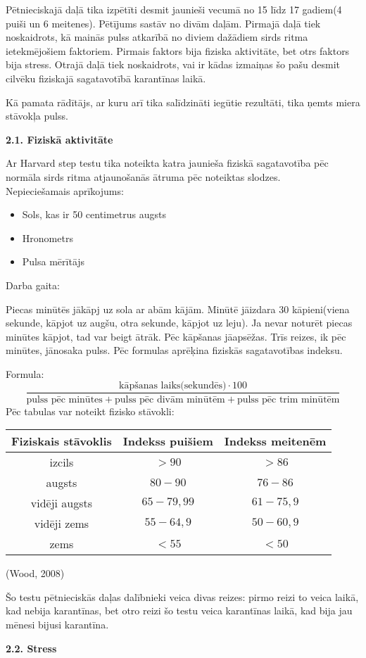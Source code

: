 \documentclass[12pt]{article}
\begin{document}
Pētnieciskajā daļā tika izpētīti desmit jaunieši vecumā no 15 līdz 17 gadiem(4 puiši un 6 meitenes). Pētījums sastāv no divām daļām. Pirmajā daļā tiek noskaidrots, kā mainās pulss atkarībā no diviem  dažādiem sirds ritma ietekmējošiem faktoriem. Pirmais faktors bija fiziska aktivitāte, bet otrs faktors bija stress. Otrajā daļā tiek noskaidrots, vai ir kādas izmaiņas šo pašu desmit cilvēku fiziskajā sagatavotībā karantīnas laikā.\par
Kā pamata rādītājs, ar kuru arī tika salīdzināti iegūtie rezultāti, tika ņemts miera stāvokļa pulss.

\begin{center}
{\bf 2.1. Fiziskā aktivitāte}
\end{center}

Ar Harvard step testu tika noteikta katra jaunieša fiziskā sagatavotība pēc normāla sirds ritma atjaunošanās ātruma pēc noteiktas slodzes.\\
Nepieciešamais aprīkojums:
\begin{itemize}
\setlength\itemsep{0em}
  \item Sols, kas ir 50 centimetrus augsts
  \item Hronometrs
  \item Pulsa mērītājs
\end{itemize}

Darba gaita:\par
Piecas minūtēs jākāpj uz sola ar abām kājām. Minūtē jāizdara 30 kāpieni(viena sekunde, kāpjot uz augšu, otra sekunde, kāpjot uz leju). Ja nevar noturēt piecas minūtes kāpjot, tad var beigt ātrāk. Pēc kāpšanas jāapsēžas. Trīs reizes, ik pēc minūtes, jānosaka pulss. Pēc formulas aprēķina fiziskās sagatavotības indeksu.\par
Formula:
$$\frac{\text{kāpšanas\ laiks(sekundēs)}\cdot 100}{\text{pulss\  pēc\  minūtes} + \text{pulss\ pēc\ divām\ minūtēm} + \text{pulss\ pēc\ trim\ minūtēm}}$$
Pēc tabulas var noteikt fizisko stāvokli: 
\begin{center}
    \begin{tabular}{|c|c|c|}
    \hline
    Fiziskais stāvoklis & Indekss puišiem & Indekss meitenēm\\\hline
    izcils & $>90$ & $>86$\\\hline
    augsts & $80-90$ & $76-86$\\\hline
    vidēji augsts & $65-79,99$ & $61-75,9$\\\hline
    vidēji zems & $55-64,9$ & $50-60,9$\\\hline
    zems & $<55$ & $<50$\\
    \hline
    \end{tabular}
\end{center}
(Wood, 2008)\par
Šo testu pētnieciskās daļas dalībnieki veica divas reizes: pirmo reizi to veica laikā, kad nebija karantīnas, bet otro reizi šo testu veica karantīnas laikā, kad bija jau mēnesi bijusi karantīna. 
\begin{center}
{\bf 2.2. Stress}
\end{center}
\end{document}
